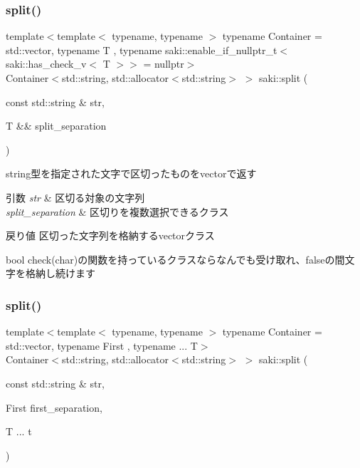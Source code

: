 \subsubsection{\texorpdfstring{split()}{split()}\hspace{0.1cm}{\footnotesize\ttfamily [1/2]}}
{\footnotesize\ttfamily template$<$template$<$ typename, typename $>$ typename Container = std\+::vector, typename T , typename saki\+::enable\+\_\+if\+\_\+nullptr\+\_\+t$<$ saki\+::has\+\_\+check\+\_\+v$<$ T $>$$>$  = nullptr$>$ \\
Container$<$std\+::string, std\+::allocator$<$std\+::string$>$ $>$ saki\+::split (\begin{DoxyParamCaption}\item[{const std\+::string \&}]{str,  }\item[{T \&\&}]{split\+\_\+separation }\end{DoxyParamCaption})}



string型を指定された文字で区切ったものをvectorで返す 


\begin{DoxyParams}{引数}
{\em str} & 区切る対象の文字列 \\
\hline
{\em split\+\_\+separation} & 区切りを複数選択できるクラス \\
\hline
\end{DoxyParams}
\begin{DoxyReturn}{戻り値}
区切った文字列を格納するvectorクラス
\end{DoxyReturn}
bool check(char)の関数を持っているクラスならなんでも受け取れ、falseの間文字を格納し続けます \mbox{\label{namespacesaki_ac1464436ac78ade2ba14371e2efe1fd2}} 
\subsubsection{\texorpdfstring{split()}{split()}\hspace{0.1cm}{\footnotesize\ttfamily [2/2]}}
{\footnotesize\ttfamily template$<$template$<$ typename, typename $>$ typename Container = std\+::vector, typename First , typename ... T$>$ \\
Container$<$std\+::string, std\+::allocator$<$std\+::string$>$ $>$ saki\+::split (\begin{DoxyParamCaption}\item[{const std\+::string \&}]{str,  }\item[{First}]{first\+\_\+separation,  }\item[{T ...}]{t }\end{DoxyParamCaption})}



